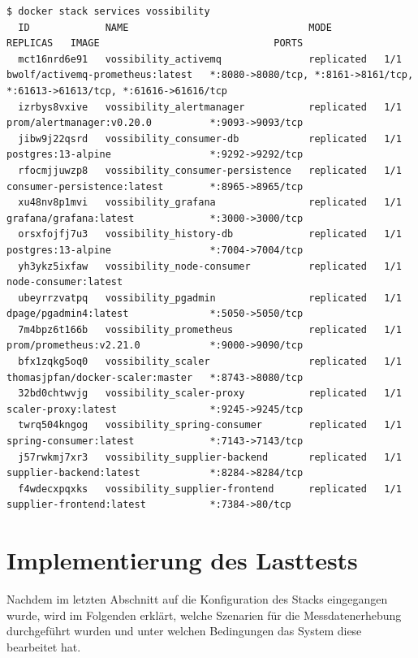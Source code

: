 \begin{lstlisting}[style=javaStyle,caption={Dockerfile - Supplier},label=lst:supplierDockerfile]
  $ docker stack services vossibility
  ID             NAME                               MODE         REPLICAS   IMAGE                              PORTS
  mct16nrd6e91   vossibility_activemq               replicated   1/1        bwolf/activemq-prometheus:latest   *:8080->8080/tcp, *:8161->8161/tcp, *:61613->61613/tcp, *:61616->61616/tcp
  izrbys8vxive   vossibility_alertmanager           replicated   1/1        prom/alertmanager:v0.20.0          *:9093->9093/tcp
  jibw9j22qsrd   vossibility_consumer-db            replicated   1/1        postgres:13-alpine                 *:9292->9292/tcp
  rfocmjjuwzp8   vossibility_consumer-persistence   replicated   1/1        consumer-persistence:latest        *:8965->8965/tcp
  xu48nv8p1mvi   vossibility_grafana                replicated   1/1        grafana/grafana:latest             *:3000->3000/tcp
  orsxfojfj7u3   vossibility_history-db             replicated   1/1        postgres:13-alpine                 *:7004->7004/tcp
  yh3ykz5ixfaw   vossibility_node-consumer          replicated   1/1        node-consumer:latest
  ubeyrrzvatpq   vossibility_pgadmin                replicated   1/1        dpage/pgadmin4:latest              *:5050->5050/tcp
  7m4bpz6t166b   vossibility_prometheus             replicated   1/1        prom/prometheus:v2.21.0            *:9000->9090/tcp
  bfx1zqkg5oq0   vossibility_scaler                 replicated   1/1        thomasjpfan/docker-scaler:master   *:8743->8080/tcp
  32bd0chtwvjg   vossibility_scaler-proxy           replicated   1/1        scaler-proxy:latest                *:9245->9245/tcp
  twrq504kngog   vossibility_spring-consumer        replicated   1/1        spring-consumer:latest             *:7143->7143/tcp
  j57rwkmj7xr3   vossibility_supplier-backend       replicated   1/1        supplier-backend:latest            *:8284->8284/tcp
  f4wdecxpqxks   vossibility_supplier-frontend      replicated   1/1        supplier-frontend:latest           *:7384->80/tcp
\end{lstlisting}

\section{Implementierung des Lasttests}
Nachdem im letzten Abschnitt auf die Konfiguration des Stacks eingegangen wurde, wird im Folgenden erklärt, welche Szenarien für die Messdatenerhebung durchgeführt wurden und unter welchen Bedingungen das System diese bearbeitet hat.

